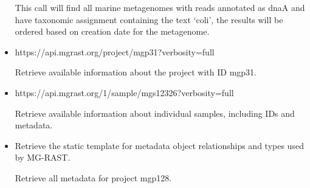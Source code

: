 \documentclass[letterpaper,10pt,english]{sphinxmanual}
\begin{document}
\begin{itemize}
This call will find all marine metagenomes with reads annotated as
dnaA and have taxonomic assignment containing the text ‘coli’, the
results will be ordered based on creation date for the metagenome.

\item {} 

\begin{sphinxVerbatim}[commandchars=\\\{\}]
https://api.mg\PYGZhy{}rast.org/project/mgp31?verbosity=full
\end{sphinxVerbatim}

Retrieve available information about the project with ID mgp31.

\item {} 

\begin{sphinxVerbatim}[commandchars=\\\{\}]
https://api.mg\PYGZhy{}rast.org/1/sample/mgs12326?verbosity=full
\end{sphinxVerbatim}

Retrieve available information about individual samples, including
IDs and metadata.

\item {} 

\begin{sphinxVerbatim}[commandchars=\\\{\}]
\end{sphinxVerbatim}

Retrieve the static template for metadata object relationships and
types used by MG-RAST.

\begin{sphinxVerbatim}[commandchars=\\\{\}]
\end{sphinxVerbatim}

Retrieve all metadata for project mgp128.

\begin{sphinxVerbatim}[commandchars=\\\{\}]
\end{sphinxVerbatim}


\end{itemize}
\end{document}
